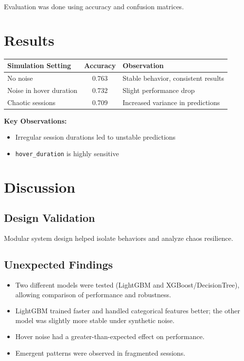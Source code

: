 \documentclass[12pt]{article}
\begin{document}
	\noindent Evaluation was done using accuracy and confusion matrices.
	
	\section{Results}
	\begin{longtable}{|l|c|p{8cm}|}
		\hline
		\textbf{Simulation Setting} & \textbf{Accuracy} & \textbf{Observation} \\
		\hline
		No noise & 0.763 & Stable behavior, consistent results \\
		Noise in hover duration & 0.732 & Slight performance drop \\
		Chaotic sessions & 0.709 & Increased variance in predictions \\
		\hline
	\end{longtable}
	
	\textbf{Key Observations:}
	\begin{itemize}
		\item Irregular session durations led to unstable predictions
		\item \texttt{hover\_duration} is highly sensitive
	\end{itemize}
	
	\section{Discussion}
	
	\subsection{Design Validation}
	Modular system design helped isolate behaviors and analyze chaos resilience.
	
	\subsection{Unexpected Findings}
	\begin{itemize}
		\item Two different models were tested (LightGBM and XGBoost/DecisionTree), allowing comparison of performance and robustness.
		\item LightGBM trained faster and handled categorical features better; the other model was slightly more stable under synthetic noise.
		\item Hover noise had a greater-than-expected effect on performance.
		\item Emergent patterns were observed in fragmented sessions.
	\end{itemize}
    
\end{document}
